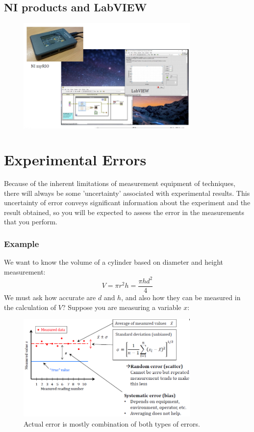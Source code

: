 \documentclass[class=report, crop=false, 12pt,a4paper]{standalone}
\begin{document}
\subsection{NI products and LabVIEW}
\begin{figure}[H]
  \centering
  \includegraphics[width = 0.8\textwidth]{../img/diagram61.png}
\end{figure}
\section{Experimental Errors}
Because of the inherent limitations of measurement equipment of techniques, there will always be some 'uncertainty' associated with experimental results. This uncertainty of error conveys significant information about the experiment and the result obtained, so you will be expected to assess the error in the measurements that you perform.
\subsubsection*{Example}
We want to know the volume of a cylinder based on diameter and height measurement:
\begin{equation}
  V = \pi r^2 h = \frac{\pi h d^2}{4}
\end{equation}
We must ask how accurate are $d$ and $h$, and also how they can be measured in the calculation of $V$? Suppose you are measuring a variable $x$:
\begin{figure}[H]
  \centering
  \includegraphics[width = 0.8\textwidth]{../img/diagram62.png}
  \caption{Actual error is mostly combination of both types of errors.}
\end{figure}
\end{document}
